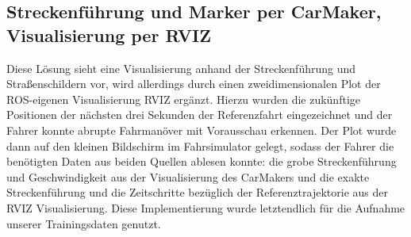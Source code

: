 \subsection{Streckenführung und Marker per CarMaker, Visualisierung per RVIZ}
\label{sec:Probleme_Loesungen_Vergleiche_ss3}
Diese Lösung sieht eine Visualisierung anhand der Streckenführung und Straßenschildern vor, wird allerdings durch einen zweidimensionalen Plot der ROS-eigenen Visualisierung RVIZ ergänzt.  Hierzu wurden die zukünftige Positionen der nächsten drei Sekunden der Referenzfahrt eingezeichnet und der Fahrer konnte abrupte Fahrmanöver mit Vorausschau erkennen.
Der Plot wurde dann auf den kleinen Bildschirm im Fahrsimulator gelegt, sodass der Fahrer die benötigten Daten aus beiden Quellen ablesen konnte: die grobe Streckenführung und Geschwindigkeit aus der Visualisierung des CarMakers und die exakte Streckenführung und die Zeitschritte bezüglich der Referenztrajektorie aus der RVIZ Visualisierung. 
Diese Implementierung wurde letztendlich für die Aufnahme unserer Trainingsdaten genutzt.
